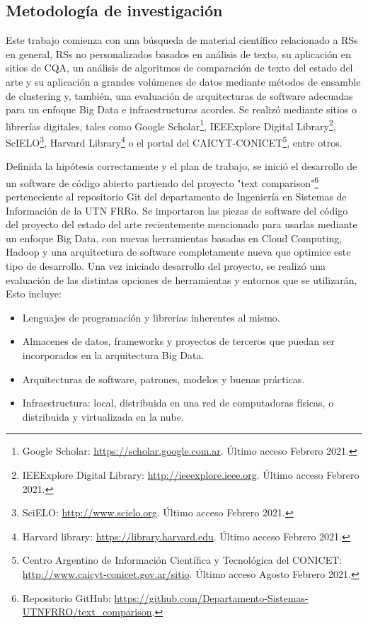 \subsection{Metodología de investigación}
Este trabajo comienza con una búsqueda de material científico relacionado a RSs en general, RSs no personalizados basados en análisis de texto, su aplicación en sitios de CQA, un análisis de algoritmos de comparación de texto del estado del arte y su aplicación a grandes volúmenes de datos mediante métodos de ensamble de clustering y, también, una evaluación de arquitecturas de software adecuadas para un enfoque Big Data e infraestructuras acordes. Se realizó mediante sitios o librerías digitales, tales como Google Scholar\footnote{Google Scholar: \url{https://scholar.google.com.ar}. Último acceso Febrero 2021.}, IEEExplore Digital Library\footnote{IEEExplore Digital Library: \url{http://ieeexplore.ieee.org}. Último acceso Febrero 2021.}, ScIELO\footnote{SciELO: \url{http://www.scielo.org}. Último acceso Febrero 2021.}, Harvard Library\footnote{Harvard library: \url{https://library.harvard.edu}. Último acceso Febrero 2021.} o el portal del CAICYT-CONICET\footnote{Centro Argentino de Información Científica y Tecnológica del CONICET: \url{http://www.caicyt-conicet.gov.ar/sitio}. Último acceso Agosto Febrero 2021.}, entre otros.

\bigskip Definida la hipótesis correctamente y el plan de trabajo, se inició el desarrollo de un software de código abierto partiendo del proyecto "text comparison"\footnote{Repositorio GitHub: \url{https://github.com/Departamento-Sistemas-UTNFRRO/text_comparison}.} perteneciente al repositorio Git del departamento de Ingeniería en Sistemas de Información de la UTN FRRo. Se importaron las piezas de software del código del proyecto del estado del arte recientemente mencionado para usarlas mediante un enfoque Big Data, con nuevas herramientas basadas en Cloud Computing, Hadoop y una arquitectura de software completamente nueva que optimice este tipo de desarrollo. Una vez iniciado desarrollo del proyecto, se realizó una evaluación de las distintas opciones de herramientas y entornos que se utilizarán, Esto incluye:

\begin{itemize}
	\item Lenguajes de programación y librerías inherentes al mismo.
	\item Almacenes de datos, frameworks y proyectos de terceros que puedan ser incorporados en la arquitectura Big Data.
	\item Arquitecturas de software, patrones, modelos y buenas prácticas.
	\item Infraestructura: local, distribuida en una red de computadoras físicas, o distribuida y virtualizada en la nube.
\end{itemize}

